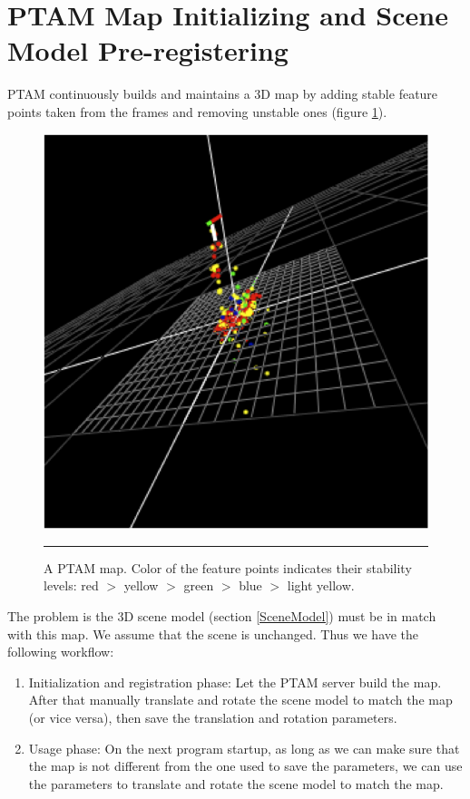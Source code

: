 
\section{PTAM Map Initializing and Scene Model Pre-registering}
\label{MapInitializing}

PTAM continuously builds and maintains a 3D map by adding stable feature points taken from the frames and removing unstable ones (figure \ref{fig:Map}).

\begin{figure}[htbp]
	\centering
	\includegraphics{./Primitives/map.png}
	\rule{35em}{0.5pt}
	\caption[A PTAM map]{A PTAM map. Color of the feature points indicates their stability levels: red $>$ yellow $>$ green $>$ blue $>$ light yellow.}
	\label{fig:Map}
\end{figure}

The problem is the 3D scene model (section \ref{SceneModel}) must be in match with this map. We assume that the scene is unchanged. Thus we have the following workflow:

\begin{enumerate}
	\item Initialization and registration phase: Let the PTAM server build the map. After that manually translate and rotate the scene model to match the map (or vice versa), then save the translation and rotation parameters.
	\item Usage phase: On the next program startup, as long as we can make sure that the map is not different from the one used to save the parameters, we can use the parameters to translate and rotate the scene model to match the map.
\end{enumerate}


